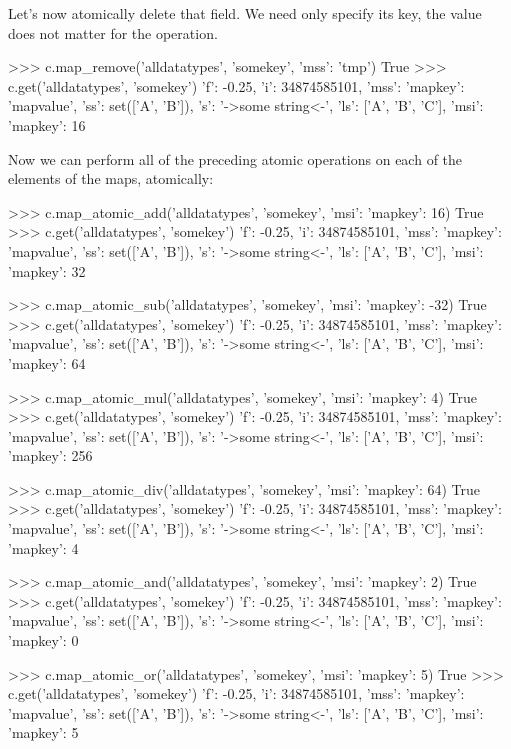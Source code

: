 Let's now atomically delete that field. We need only specify its key, the value
does not matter for the  operation.

\begin{pythoncode}
>>> c.map_remove('alldatatypes', 'somekey', {'mss': 'tmp'})
True
>>> c.get('alldatatypes', 'somekey')
{'f': -0.25, 'i': 34874585101, 'mss': {'mapkey': 'mapvalue'}, 'ss': set(['A', 'B']), 's': '->some string<-', 'ls': ['A', 'B', 'C'], 'msi': {'mapkey': 16}}
\end{pythoncode}

Now we can perform all of the preceding atomic operations on each of the
elements of the maps, atomically:

\begin{pythoncode}
>>> c.map_atomic_add('alldatatypes', 'somekey', {'msi': {'mapkey': 16}})
True
>>> c.get('alldatatypes', 'somekey')
{'f': -0.25, 'i': 34874585101, 'mss': {'mapkey': 'mapvalue'}, 'ss': set(['A', 'B']), 's': '->some string<-', 'ls': ['A', 'B', 'C'], 'msi': {'mapkey': 32}}

>>> c.map_atomic_sub('alldatatypes', 'somekey', {'msi': {'mapkey': -32}})
True
>>> c.get('alldatatypes', 'somekey')
{'f': -0.25, 'i': 34874585101, 'mss': {'mapkey': 'mapvalue'}, 'ss': set(['A', 'B']), 's': '->some string<-', 'ls': ['A', 'B', 'C'], 'msi': {'mapkey': 64}}

>>> c.map_atomic_mul('alldatatypes', 'somekey', {'msi': {'mapkey': 4}})
True
>>> c.get('alldatatypes', 'somekey')
{'f': -0.25, 'i': 34874585101, 'mss': {'mapkey': 'mapvalue'}, 'ss': set(['A', 'B']), 's': '->some string<-', 'ls': ['A', 'B', 'C'], 'msi': {'mapkey': 256}}

>>> c.map_atomic_div('alldatatypes', 'somekey', {'msi': {'mapkey': 64}})
True
>>> c.get('alldatatypes', 'somekey')
{'f': -0.25, 'i': 34874585101, 'mss': {'mapkey': 'mapvalue'}, 'ss': set(['A', 'B']), 's': '->some string<-', 'ls': ['A', 'B', 'C'], 'msi': {'mapkey': 4}}

>>> c.map_atomic_and('alldatatypes', 'somekey', {'msi': {'mapkey': 2}})
True
>>> c.get('alldatatypes', 'somekey')
{'f': -0.25, 'i': 34874585101, 'mss': {'mapkey': 'mapvalue'}, 'ss': set(['A', 'B']), 's': '->some string<-', 'ls': ['A', 'B', 'C'], 'msi': {'mapkey': 0}}

>>> c.map_atomic_or('alldatatypes', 'somekey', {'msi': {'mapkey': 5}})
True
>>> c.get('alldatatypes', 'somekey')
{'f': -0.25, 'i': 34874585101, 'mss': {'mapkey': 'mapvalue'}, 'ss': set(['A', 'B']), 's': '->some string<-', 'ls': ['A', 'B', 'C'], 'msi': {'mapkey': 5}}


\end{pythoncode}
